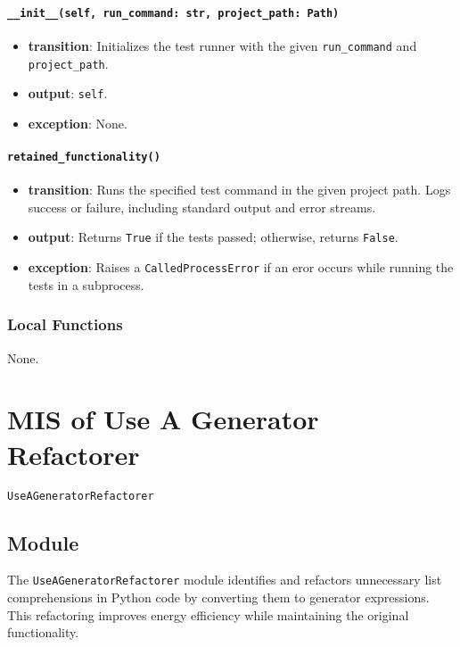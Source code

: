 \documentclass[12pt, titlepage]{article}
\begin{document}
\paragraph{\texttt{\_\_init\_\_(self, run\_command: str, project\_path: Path)}}
\begin{itemize}
  \item \textbf{transition}: Initializes the test runner with the given \texttt{run\_command} and \texttt{project\_path}.
  \item \textbf{output}: \texttt{self}.
  \item \textbf{exception}: None.
\end{itemize}

\paragraph{\texttt{retained\_functionality()}}
\begin{itemize}
  \item \textbf{transition}: Runs the specified test command in the given project path. Logs success or failure, including standard output and error streams.
  \item \textbf{output}: Returns \texttt{True} if the tests passed; otherwise, returns \texttt{False}.
  \item \textbf{exception}: Raises a \texttt{CalledProcessError} if an eror occurs while running the tests in a subprocess.
\end{itemize}

\subsubsection{Local Functions}
None.

\newpage

\section{MIS of Use A Generator Refactorer} \label{mis:UseGen}

\texttt{UseAGeneratorRefactorer}

\subsection{Module}

The \texttt{UseAGeneratorRefactorer} module identifies and refactors 
unnecessary list comprehensions in Python code by converting them to generator expressions. This refactoring improves energy efficiency while maintaining the original functionality.
\end{document}
